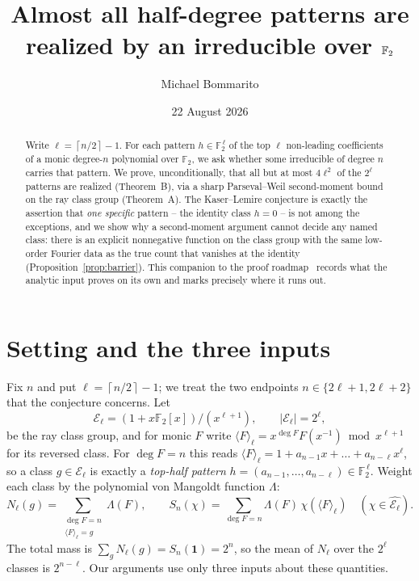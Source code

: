 \documentclass[10pt]{article}
\title{\vspace{-2.2em}Almost all half-degree patterns are realized by an irreducible over $\F_2$}
\author{Michael Bommarito}
\date{22 August 2026}
\theoremstyle{plain}
\newcommand{\F}{\mathbb F}
\newcommand{\E}{\mathcal E}
\newcommand{\Lam}{\Lambda}
\newcommand{\ceil}[1]{\left\lceil #1\right\rceil}
\newcommand{\one}{\mathbf 1}
\begin{document}
\maketitle
\vspace{-1.8em}

\begin{abstract}
Write $\ell=\ceil{n/2}-1$. For each pattern $h\in\F_2^{\,\ell}$ of the top
$\ell$ non-leading coefficients of a monic degree-$n$ polynomial over $\F_2$,
we ask whether some irreducible of degree $n$ carries that pattern. We prove,
unconditionally, that all but at most $4\ell^2$ of the $2^\ell$ patterns are
realized (Theorem~B), via a sharp Parseval--Weil second-moment bound on the
ray class group (Theorem~A). The Kaser--Lemire conjecture is exactly the
assertion that \emph{one specific} pattern -- the identity class $h=0$ -- is
not among the exceptions, and we show why a second-moment argument cannot
decide any named class: there is an explicit nonnegative function on the class
group with the same low-order Fourier data as the true count that vanishes at
the identity (Proposition~\ref{prop:barrier}). This companion to the
proof roadmap~\cite{roadmap} records what the analytic input proves on its
own and marks precisely where it runs out.
\end{abstract}

\section{Setting and the three inputs}\label{sec:setting}

Fix $n$ and put $\ell=\ceil{n/2}-1$; we treat the two endpoints
$n\in\{2\ell+1,2\ell+2\}$ that the conjecture concerns. Let
\[
 \E_\ell=(1+x\F_2[x])/(x^{\ell+1}),\qquad |\E_\ell|=2^\ell,
\]
be the ray class group, and for monic $F$ write
$\langle F\rangle_\ell=x^{\deg F}F(x^{-1})\bmod x^{\ell+1}$ for its reversed
class. For $\deg F=n$ this reads
$\langle F\rangle_\ell=1+a_{n-1}x+\dots+a_{n-\ell}x^\ell$, so a class
$g\in\E_\ell$ is exactly a \emph{top-half pattern}
$h=(a_{n-1},\dots,a_{n-\ell})\in\F_2^{\,\ell}$. Weight each class by the
polynomial von Mangoldt function $\Lam$:
\[
 N_\ell(g)=\sum_{\substack{\deg F=n\\ \langle F\rangle_\ell=g}}\Lam(F),
 \qquad
 S_n(\chi)=\sum_{\deg F=n}\Lam(F)\,\chi(\langle F\rangle_\ell)
 \quad(\chi\in\widehat{\E_\ell}).
\]
The total mass is $\sum_g N_\ell(g)=S_n(\one)=2^n$, so the mean of $N_\ell$
over the $2^\ell$ classes is $2^{n-\ell}$. Our arguments use only three
inputs about these quantities.
\end{document}
